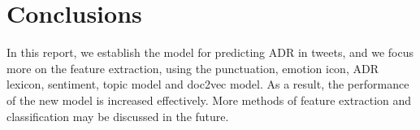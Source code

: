 \documentclass[11pt]{article}
\begin{document}
%


%
%
%
%



\section{Conclusions}

In this report, we establish the model for predicting ADR in tweets,
and we focus more on the feature extraction,
using the punctuation, emotion icon, ADR lexicon, sentiment,
topic model and doc2vec model.
As a result, the performance of the new model is increased effectively.
More methods of feature extraction and classification may be discussed in the future.




\end{document}
